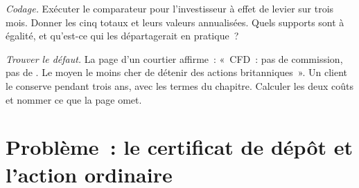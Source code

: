 \begin{exercise}[$\star\star\star$]\label{exo:m1:delta-one-instruments:7}
\emph{Codage.} Exécuter le comparateur pour l'investisseur à effet de levier sur trois
mois. Donner les cinq totaux et leurs valeurs annualisées. Quels supports sont à égalité,
et qu'est-ce qui les départagerait en pratique~?
\end{exercise}

\begin{exercise}[$\star\star\star$]\label{exo:m1:delta-one-instruments:8}
\emph{Trouver le défaut.} La page d'un courtier affirme~: «~CFD~: pas de commission, pas de
. Le moyen le moins cher de détenir des actions britanniques~». Un client le conserve pendant trois ans,
avec les termes du chapitre. Calculer les deux coûts et nommer ce que la page omet.
\end{exercise}

\section{Problème~: le certificat de dépôt et l'action ordinaire}

